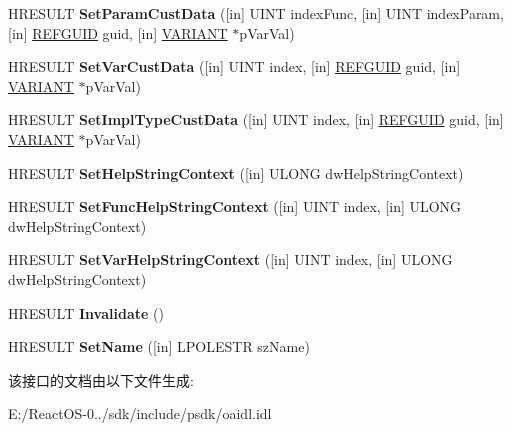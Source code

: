 \begin{DoxyCompactItemize}
\item 
\mbox{\label{interface_i_create_type_info2_a96c776c3ce87b4deaacf0928adc31916}} 
H\+R\+E\+S\+U\+LT {\bfseries Set\+Param\+Cust\+Data} (\mbox{[}in\mbox{]} U\+I\+NT index\+Func, \mbox{[}in\mbox{]} U\+I\+NT index\+Param, \mbox{[}in\mbox{]} \hyperlink{struct___g_u_i_d}{R\+E\+F\+G\+U\+ID} guid, \mbox{[}in\mbox{]} \hyperlink{structtag_v_a_r_i_a_n_t}{V\+A\+R\+I\+A\+NT} $\ast$p\+Var\+Val)
\item 
\mbox{\label{interface_i_create_type_info2_a9a25c8ce42f59cd72f31b1740885c453}} 
H\+R\+E\+S\+U\+LT {\bfseries Set\+Var\+Cust\+Data} (\mbox{[}in\mbox{]} U\+I\+NT index, \mbox{[}in\mbox{]} \hyperlink{struct___g_u_i_d}{R\+E\+F\+G\+U\+ID} guid, \mbox{[}in\mbox{]} \hyperlink{structtag_v_a_r_i_a_n_t}{V\+A\+R\+I\+A\+NT} $\ast$p\+Var\+Val)
\item 
\mbox{\label{interface_i_create_type_info2_a800202fb1575dc991797eb8348d1024a}} 
H\+R\+E\+S\+U\+LT {\bfseries Set\+Impl\+Type\+Cust\+Data} (\mbox{[}in\mbox{]} U\+I\+NT index, \mbox{[}in\mbox{]} \hyperlink{struct___g_u_i_d}{R\+E\+F\+G\+U\+ID} guid, \mbox{[}in\mbox{]} \hyperlink{structtag_v_a_r_i_a_n_t}{V\+A\+R\+I\+A\+NT} $\ast$p\+Var\+Val)
\item 
\mbox{\label{interface_i_create_type_info2_ae7f852e841bd34c90427dc55ed1ad409}} 
H\+R\+E\+S\+U\+LT {\bfseries Set\+Help\+String\+Context} (\mbox{[}in\mbox{]} U\+L\+O\+NG dw\+Help\+String\+Context)
\item 
\mbox{\label{interface_i_create_type_info2_aeda0902914ff4516bbd1d722ad7aaabc}} 
H\+R\+E\+S\+U\+LT {\bfseries Set\+Func\+Help\+String\+Context} (\mbox{[}in\mbox{]} U\+I\+NT index, \mbox{[}in\mbox{]} U\+L\+O\+NG dw\+Help\+String\+Context)
\item 
\mbox{\label{interface_i_create_type_info2_a464c83383379934c3bfcda99679c9958}} 
H\+R\+E\+S\+U\+LT {\bfseries Set\+Var\+Help\+String\+Context} (\mbox{[}in\mbox{]} U\+I\+NT index, \mbox{[}in\mbox{]} U\+L\+O\+NG dw\+Help\+String\+Context)
\item 
\mbox{\label{interface_i_create_type_info2_a2ab49d6a4cd79dc79ef186a65780a4e8}} 
H\+R\+E\+S\+U\+LT {\bfseries Invalidate} ()
\item 
\mbox{\label{interface_i_create_type_info2_a11ef37c34cc76ec1680c6fb4d813312c}} 
H\+R\+E\+S\+U\+LT {\bfseries Set\+Name} (\mbox{[}in\mbox{]} L\+P\+O\+L\+E\+S\+TR sz\+Name)
\end{DoxyCompactItemize}


该接口的文档由以下文件生成\+:\begin{DoxyCompactItemize}
\item 
E\+:/\+React\+O\+S-\/0../sdk/include/psdk/oaidl.\+idl\end{DoxyCompactItemize}
